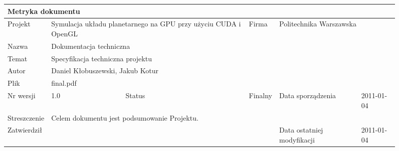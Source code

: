 \begin{figure}[h]
	\centering
\begin{tabular}{|p{}|p{}|p{}|p{}|p{}|p{}|p{}|}
	\hline
	\multicolumn{7}{|l|}{Metryka dokumentu} \\
	\hline
	Projekt & \multicolumn{2}{p{.34\textwidth}|}{Symulacja układu planetarnego na GPU przy użyciu CUDA i OpenGL} &
	Firma & \multicolumn{3}{l|}{Politechnika Warszawska} \\
	\hline
	Nazwa & \multicolumn{6}{l|}{Dokumentacja techniczna} \\
	\hline
	Temat & \multicolumn{6}{l|}{Specyfikacja techniczna projektu} \\
	\hline
	Autor & \multicolumn{6}{l|}{Daniel Kłobuszewski, Jakub Kotur} \\
	\hline
	Plik & \multicolumn{6}{l|}{final.pdf} \\
	\hline
	Nr wersji & 1.0 & Status & Finalny & \multicolumn{2}{l|}{Data sporządzenia} & 2011-01-04 \\
	\hline
	Streszczenie & \multicolumn{6}{p{11cm}|}{Celem dokumentu jest podsumowanie Projektu.} \\
	\hline
	Zatwierdził & \multicolumn{3}{l|}{ } &
	\multicolumn{2}{l|}{Data ostatniej modyfikacji} & 2011-01-04 \\
	\hline
\end{tabular}

	\label{tab:metric}
\end{figure}


